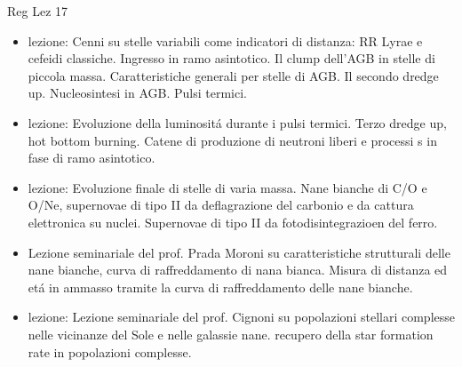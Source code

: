 \begin{frame}[allowframebreaks]{Reg Lez 17}
\begin{itemize}
\item lezione: Cenni su stelle variabili come indicatori di distanza: RR Lyrae e cefeidi classiche. Ingresso in ramo asintotico. Il clump dell'AGB in stelle di piccola massa. Caratteristiche generali per stelle di AGB. Il secondo dredge up. Nucleosintesi in AGB. Pulsi termici.
\item lezione: Evoluzione della luminosit\'a durante i pulsi termici. Terzo dredge up, hot bottom burning. Catene di produzione di neutroni liberi e processi s in fase di ramo asintotico.
\item lezione: Evoluzione finale di stelle di varia massa. Nane bianche di C/O e O/Ne, supernovae di tipo II da deflagrazione del carbonio e da cattura elettronica su nuclei. Supernovae di tipo II da fotodisintegrazioen del ferro.
\item Lezione seminariale del prof. Prada Moroni su caratteristiche strutturali delle nane bianche, curva di raffreddamento di nana bianca. Misura di distanza ed et\'a in ammasso tramite la curva di raffreddamento delle nane bianche.
\item lezione: Lezione seminariale del prof. Cignoni su popolazioni stellari complesse nelle vicinanze del Sole e nelle galassie nane. recupero della star formation rate in popolazioni complesse.
\end{itemize}
\end{frame}

